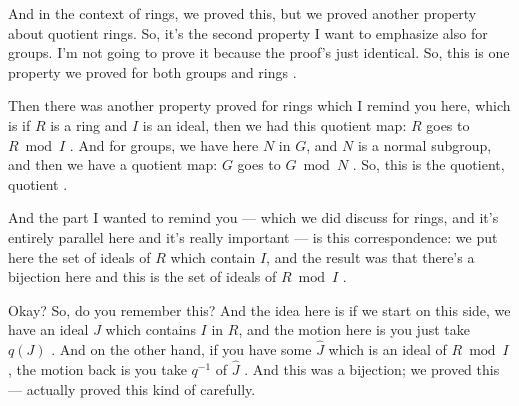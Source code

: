 \begin{content}

\end{content}

\begin{speech}[00:14:14 - 00:16:05]
And in the context of rings, we proved this, but we proved another property about quotient rings. So, it's the second property I want to emphasize also for groups. I'm not going to prove it because the proof's just identical. So, this is one property we proved for both groups and rings .

Then there was another property proved for rings which I remind you here, which is if $R$ is a ring and $I$ is an ideal, then we had this quotient map: $R$ goes to $R \bmod I$ . And for groups, we have here $N$ in $G$, and $N$ is a normal subgroup, and then we have a quotient map: $G$ goes to $G \bmod N$ . So, this is the quotient, quotient .

And the part I wanted to remind you --- which we did discuss for rings, and it's entirely parallel here and it's really important --- is this correspondence: we put here the set of ideals of $R$ which contain $I$, and the result was that there's a bijection here and this is the set of ideals of $R \bmod I$ .

Okay? So, do you remember this? And the idea here is if we start on this side, we have an ideal $J$ which contains $I$ in $R$, and the motion here is you just take $q(J)$ . And on the other hand, if you have some $\hat{J}$ which is an ideal of $R \bmod I$, the motion back is you take $q^{-1}$ of $\hat{J}$ . And this was a bijection; we proved this --- actually proved this kind of carefully.
\end{speech}

